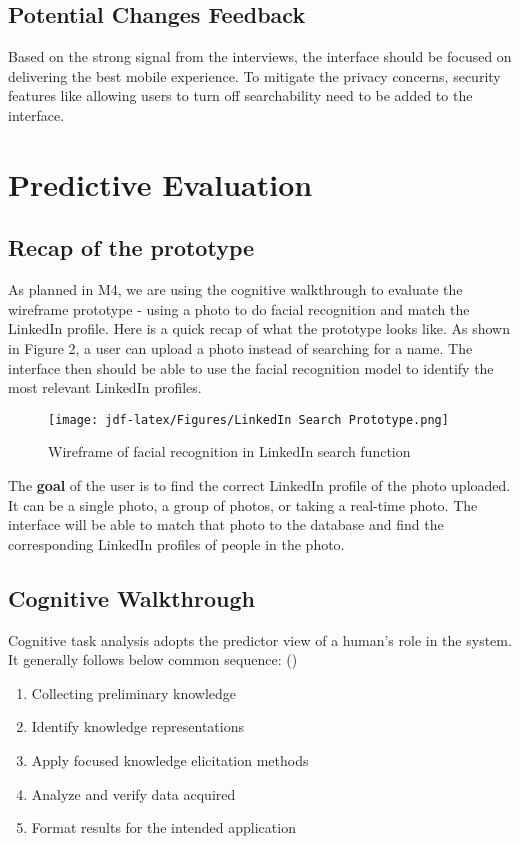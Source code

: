 \documentclass[
	letterpaper, %
]{jdf}
\begin{document}
\subsection{Potential Changes Feedback}
Based on the strong signal from the interviews, the interface should be focused on delivering the best mobile experience. To mitigate the privacy concerns, security features like allowing users to turn off searchability need to be added to the interface.

\section{Predictive Evaluation}
\subsection{Recap of the prototype}
As planned in M4, we are using the cognitive walkthrough to evaluate the wireframe prototype - using a photo to do facial recognition and match the LinkedIn profile. Here is a quick recap of what the prototype looks like. As shown in Figure 2, a user can upload a photo instead of searching for a name. The interface then should be able to use the facial recognition model to identify the most relevant LinkedIn profiles.

\begin{figure}[h]
	\centering
	\texttt{[image: jdf-latex/Figures/LinkedIn Search Prototype.png]}
	\caption{Wireframe of facial recognition in LinkedIn search function}
	\label{fig:wireframe}
\end{figure}

The \textbf{goal} of the user is to find the correct LinkedIn profile of the photo uploaded. It can be a single photo, a group of photos, or taking a real-time photo. The interface will be able to match that photo to the database and find the corresponding LinkedIn profiles of people in the photo.
\subsection{Cognitive Walkthrough}
Cognitive task analysis adopts the predictor view of a human's role in the system. It generally follows below common sequence: (\cite{joyner2016})

\begin{enumerate}
	\item Collecting preliminary knowledge
	\item Identify knowledge representations
	\item Apply focused knowledge elicitation methods
	\item Analyze and verify data acquired
	\item Format results for the intended application
\end{enumerate}
\end{document}

